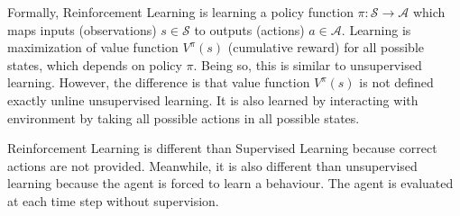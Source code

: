 Formally, Reinforcement Learning is learning a policy function 
$\pi \colon \mathcal{S} \rightarrow \mathcal{A}$ which maps 
inputs (observations) $s \in \mathcal{S}$ to outputs (actions) $a \in \mathcal{A}$. 
Learning is maximization of value function $V^{\pi}(s)$ (cumulative reward) for all possible states, which depends on policy $\pi$. 
Being so, this is similar to unsupervised learning. 
However, the difference is that value function $V^{\pi}(s)$ is not defined exactly unline unsupervised learning. 
It is also learned by interacting with environment by taking all possible actions in all possible states. 

Reinforcement Learning is different than Supervised Learning because correct actions are not provided. 
Meanwhile, it is also different than unsupervised learning because the agent is forced to learn a behaviour. 
The agent is evaluated at each time step without supervision.